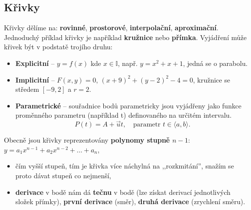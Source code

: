 \subsection{Křivky}
Křivky dělíme na: \textbf{rovinné}, \textbf{prostorové}, \textbf{interpolační}, \textbf{aproximační}. Jednoduchý příklad křivky je například \textbf{kružnice} nebo \textbf{přímka}. Vyjádření může křivek být v podstatě trojího druhu:
\begin{itemize}
	\item \textbf{Explicitní} -- $y = f(x)$  kde  $x  \in   \mathbb{I}$, např. $y = x^{2} + x + 1$, jedná se o parabolu.
	\item \textbf{Implicitní} -- $F(x, y) = 0$,  $(x+9)^{2} +(y −2)^{2} −4 = 0$, kružnice se středem $[−9, 2]$ a $r=2$.
	\item \textbf{Parametrické}	-- souřadnice bodů parametricky jsou vyjádřeny jako funkce proměnného parametru (například t) definovaného na určitém intervalu. 
	\begin{equation*}
				P(t) = A + \vec{u}t, \quad \textrm{parametr }  t  \in \langle a, b \rangle.
		\end{equation*}
\end{itemize}

\noindent Obecně jsou křivky reprezentovány \textbf{polynomy stupně $ n - 1 $}: $y = a_1x^{n - 1} + a_2x^{n - 2} + \ldots + a_n$,
\begin{itemize}
\item čím vyšší stupeň, tím je křivka více náchylná na ,,rozkmitání'', snažím se proto dávat stupeň co nejmenší,
\item \textbf{derivace} v bodě nám dá \textbf{tečnu} v bodě (lze získat derivací jednotlivých složek přímky), \textbf{první derivace} (směr), \textbf{druhá derivace} (zrychlení směru).
\end{itemize}

